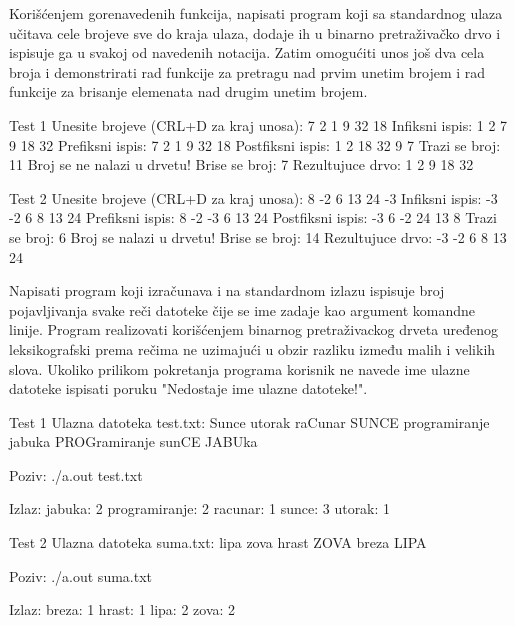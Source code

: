 \begin{Exercise}[label=701]
Korišćenjem gorenavedenih funkcija, napisati program koji sa standardnog ulaza učitava cele brojeve sve do kraja ulaza, dodaje ih u binarno pretraživačko drvo i ispisuje ga u svakoj od navedenih notacija. Zatim omogućiti unos još dva cela broja i demonstrirati rad funkcije za pretragu nad prvim unetim brojem i rad funkcije za brisanje elemenata nad drugim unetim brojem. 

\begin{maxitest}
\begin{test}{Test 1}
Unesite brojeve (CRL+D za kraj unosa): 7 2 1 9 32 18
Infiksni ispis: 1 2 7 9 18 32
Prefiksni ispis: 7 2 1 9 32 18
Postfiksni ispis: 1 2 18 32 9 7
Trazi se broj: 11
Broj se ne nalazi u drvetu!
Brise se broj: 7
Rezultujuce drvo: 1 2 9 18 32
\end{test}
\end{maxitest}

\begin{maxitest}
\begin{test}{Test 2}
Unesite brojeve (CRL+D za kraj unosa): 8 -2 6 13 24 -3
Infiksni ispis:  -3 -2 6 8 13 24
Prefiksni ispis: 8 -2 -3 6 13 24
Postfiksni ispis: -3 6 -2 24 13 8 
Trazi se broj: 6
Broj se nalazi u drvetu!
Brise se broj: 14
Rezultujuce drvo: -3 -2 6 8 13 24
\end{test}
\end{maxitest}


\end{Exercise}





\begin{Exercise}[label=702]
Napisati program koji izračunava i na standardnom izlazu ispisuje broj pojavljivanja svake reči datoteke čije se ime zadaje kao argument komandne linije. Program realizovati korišćenjem binarnog pretraživackog drveta uređenog leksikografski prema rečima ne uzimajući u obzir razliku između malih i velikih slova. Ukoliko prilikom pokretanja programa korisnik ne navede ime ulazne datoteke ispisati poruku "Nedostaje ime ulazne datoteke!".

\begin{miditest}
\begin{test}{Test 1}
Ulazna datoteka test.txt:
Sunce utorak raCunar SUNCE programiranje
jabuka PROGramiranje sunCE  JABUka

Poziv: ./a.out test.txt

Izlaz:
jabuka: 2
programiranje: 2
racunar: 1
sunce: 3
utorak: 1
\end{test}
\end{miditest}
\begin{miditest}
\begin{test}{Test 2}
Ulazna datoteka suma.txt:
lipa zova hrast ZOVA breza LIPA

Poziv: ./a.out suma.txt

Izlaz:
breza: 1
hrast: 1
lipa: 2
zova: 2
\end{test}
\end{miditest}
\end{Exercise}

